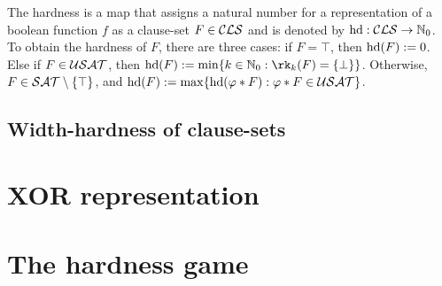 \documentclass[]{book}
\begin{document}
\begin{defi}\label{def:hd-extended}
The hardness is a map that assigns a natural number for a representation of a boolean function $f$ as a clause-set $F \in \mathcal{CLS}$ and is denoted by $\operatorname{hd} : \mathcal{CLS} \rightarrow \mathbb{N}_0$. To obtain the hardness of  $F$, there are three cases: if $F = \top$, then $\operatorname{hd}(F) := 0$. Else if $F \in \mathcal{USAT}$, then $\hardness(F) := \min \set{k \in \NNZ : \rk_k(F)=\set{\bot}}$. Otherwise, $F \in \mathcal{SAT} \setminus \{ \top \}$, and $\operatorname{hd}(F) := \max \{  \operatorname{hd}(\varphi * F) : \varphi * F \in \mathcal{USAT}  \}$.
\end{defi}


\section{Width-hardness of clause-sets}
\label{sec:whdd}

\chapter{XOR representation}
\label{cha:XOR-representation}


\chapter{The hardness game}
\label{cha:hdgame}


\newpage


\end{document}
